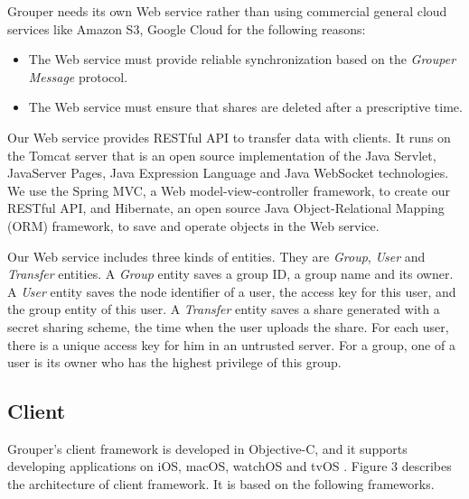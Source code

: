 \documentclass[twocolumn,10pt]{article}
\begin{document}
Grouper needs its own Web service rather than using commercial general cloud services like Amazon S3, Google Cloud for the following reasons:

\begin{itemize}
	\setlength{\itemsep}{1pt}
	\setlength{\parskip}{0pt}
	\setlength{\parsep}{0pt}
	\item The Web service must provide reliable synchronization based on the \emph{Grouper Message} protocol.
	\item The Web service must ensure that shares are deleted after a prescriptive time.
\end{itemize}

Our Web service provides RESTful API to transfer data with clients. 
It runs on the Tomcat server that is an open source implementation of the Java Servlet, JavaServer Pages, Java Expression Language and Java WebSocket technologies. 
We use the Spring MVC, a  Web model-view-controller framework, to create our RESTful API, and Hibernate, an open source Java Object-Relational Mapping (ORM) framework, to save and operate objects in the Web service. 

Our Web service includes three kinds of entities. 
They are \emph{Group}, \emph{User} and \emph{Transfer} entities. 
A \emph{Group} entity saves a group ID, a group name and its owner. 
A \emph{User} entity saves the node identifier of a user, the access key for this user, and the group entity of this user. 
A \emph{Transfer} entity saves a share generated with a secret sharing scheme, the time when the user uploads the share. 
For each user, there is a unique access key for him in an untrusted server. For a group, one of a user is its owner who has the highest privilege of this group.

\subsection{Client}

Grouper's client framework is developed in Objective-C, and it supports developing applications on iOS, macOS, watchOS and tvOS . 
Figure 3 describes the architecture of client framework. It is based on the following frameworks.   
\end{document}
